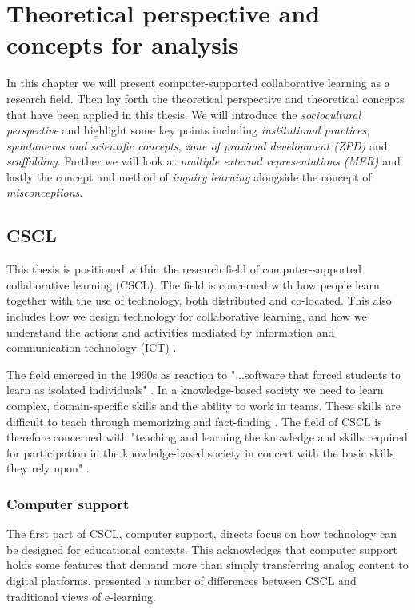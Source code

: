 \chapter{Theoretical perspective and concepts for analysis}

In this chapter we will present computer-supported collaborative learning as a research field. Then lay forth the theoretical perspective and theoretical concepts that have been applied in this thesis. We will introduce the \emph{sociocultural perspective} and highlight some key points including \emph{institutional practices}, \emph{spontaneous and scientific concepts}, \emph{zone of proximal development (ZPD)} and \emph{scaffolding}. Further we will look at \emph{multiple external representations (MER)} and lastly the concept and method of \emph{inquiry learning} alongside the concept of \emph{misconceptions}.

\section{CSCL}
This thesis is positioned within the research field of computer-supported collaborative learning (CSCL). The field is concerned with how people learn together with the use of technology, both distributed and co-located. This also includes how we design technology for collaborative learning, and how we understand the actions and activities mediated by information and communication technology (ICT) \citep{stahl2006computer,ludvigsen2010computer}.  

The field emerged in the 1990s as reaction to "...software that forced students to learn as isolated individuals" \citep{stahl2006computer}. In a knowledge-based society we need to learn complex, domain-specific skills and the ability to work in teams. These skills are difficult to teach through memorizing and fact-finding \citep{sfard1998two,ludvigsen2010computer}. The field of CSCL is therefore concerned with "teaching and learning the knowledge and skills required for participation in the knowledge-based society in concert with the basic skills they rely upon" \citep[p. 2]{ludvigsen2010computer}.

\subsection{Computer support}
The first part of CSCL, computer support, directs focus on how technology can be designed for educational contexts. This acknowledges that computer support holds some features that demand more than simply transferring analog content to digital platforms. \citet{stahl2006computer} presented a number of differences between CSCL and traditional views of e-learning. 

